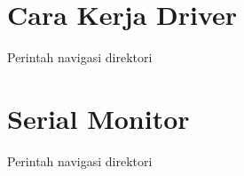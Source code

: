 \section{Cara Kerja Driver}
Perintah navigasi direktori

\section{Serial Monitor}
Perintah navigasi direktori
